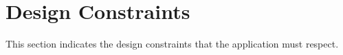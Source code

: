 \section{Design Constraints}

This section indicates the design constraints that the application must respect.



